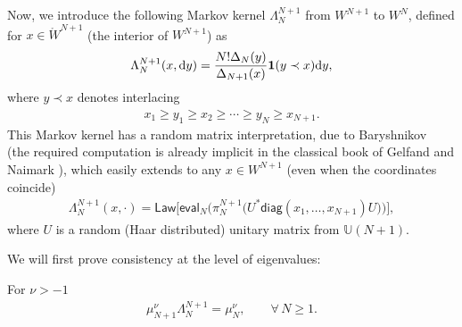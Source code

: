 Now, we introduce the following Markov kernel $\Lambda_N^{N+1}$ from $W^{N+1}$ to $W^N$, defined for \mbox{$x \in \mathring{W}^{N+1}$} (the interior of $W^{N+1}$) as
\begin{gather*}
\Lambda_N^{N+1}(x,{\rm d}y)=\frac{N!\Delta_N(y)}{\Delta_{N+1}(x)}\textbf{1}(y\prec x){\rm d}y,
\end{gather*}
where $y\prec x$ denotes interlacing
\begin{gather*}
x_1 \ge y_1 \ge x_2 \ge \cdots \ge y_N \ge x_{N+1}.
\end{gather*}
This Markov kernel has a random matrix interpretation, due to Baryshnikov~\cite{Baryshnikov} (the required computation is already implicit in the classical book of Gelfand and Naimark \cite{GelfandNaimark}), which easily extends to any $x\in W^{N+1}$ (even when the coordinates coincide)
\begin{gather*}
\Lambda_N^{N+1}(x,\cdot)=\mathsf{Law} \big[\mathsf{eval}_N \big(\pi_N^{N+1}\big(U^*\mathsf{diag}(x_1,\dots, x_{N+1})U\big)\big)\big],
\end{gather*}
where $U$ is a random (Haar distributed) unitary matrix from $\mathbb{U}(N+1)$.

We will first prove consistency at the level of eigenvalues:

\begin{Proposition}\label{eigenvalueconsistency}
For $\nu>-1$
\begin{gather*}
\mu_{N+1}^{\nu} \Lambda_N^{N+1}=\mu_N^{\nu}, \qquad \forall\, N\ge 1.
\end{gather*}
\end{Proposition}

